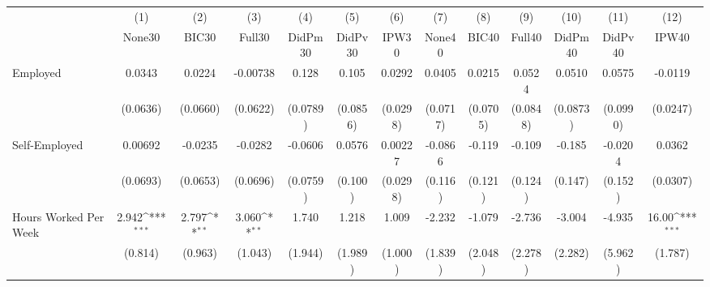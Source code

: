 {
\def\sym#1{\ifmmode^{#1}\else\(^{#1}\)\fi}
\begin{tabular}{l*{12}{c}}
\toprule
            &\multicolumn{1}{c}{(1)}&\multicolumn{1}{c}{(2)}&\multicolumn{1}{c}{(3)}&\multicolumn{1}{c}{(4)}&\multicolumn{1}{c}{(5)}&\multicolumn{1}{c}{(6)}&\multicolumn{1}{c}{(7)}&\multicolumn{1}{c}{(8)}&\multicolumn{1}{c}{(9)}&\multicolumn{1}{c}{(10)}&\multicolumn{1}{c}{(11)}&\multicolumn{1}{c}{(12)}\\
            &\multicolumn{1}{c}{None30}&\multicolumn{1}{c}{BIC30}&\multicolumn{1}{c}{Full30}&\multicolumn{1}{c}{DidPm30}&\multicolumn{1}{c}{DidPv30}&\multicolumn{1}{c}{IPW30}&\multicolumn{1}{c}{None40}&\multicolumn{1}{c}{BIC40}&\multicolumn{1}{c}{Full40}&\multicolumn{1}{c}{DidPm40}&\multicolumn{1}{c}{DidPv40}&\multicolumn{1}{c}{IPW40}\\
\midrule
Employed    &      0.0343         &      0.0224         &    -0.00738         &       0.128         &       0.105         &      0.0292         &      0.0405         &      0.0215         &      0.0524         &      0.0510         &      0.0575         &     -0.0119         \\
            &    (0.0636)         &    (0.0660)         &    (0.0622)         &    (0.0789)         &    (0.0856)         &    (0.0298)         &    (0.0717)         &    (0.0705)         &    (0.0848)         &    (0.0873)         &    (0.0990)         &    (0.0247)         \\
\addlinespace
Self-Employed&     0.00692         &     -0.0235         &     -0.0282         &     -0.0606         &      0.0576         &     0.00227         &     -0.0866         &      -0.119         &      -0.109         &      -0.185         &     -0.0204         &      0.0362         \\
            &    (0.0693)         &    (0.0653)         &    (0.0696)         &    (0.0759)         &     (0.100)         &    (0.0298)         &     (0.116)         &     (0.121)         &     (0.124)         &     (0.147)         &     (0.152)         &    (0.0307)         \\
\addlinespace
Hours Worked Per Week&       2.942\sym{***}&       2.797\sym{**} &       3.060\sym{**} &       1.740         &       1.218         &       1.009         &      -2.232         &      -1.079         &      -2.736         &      -3.004         &      -4.935         &       16.00\sym{***}\\
            &     (0.814)         &     (0.963)         &     (1.043)         &     (1.944)         &     (1.989)         &     (1.000)         &     (1.839)         &     (2.048)         &     (2.278)         &     (2.282)         &     (5.962)         &     (1.787)         \\

\end{tabular}}
